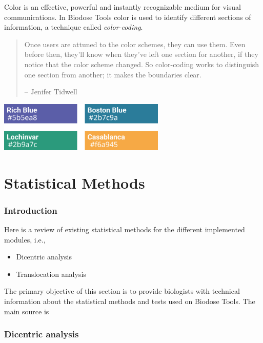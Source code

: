 \documentclass[]{scrartcl}
\providecommand{\tightlist}{%
  \setlength{\itemsep}{0pt}\setlength{\parskip}{0pt}}
\begin{document}
Color is an effective, powerful and instantly recognizable medium for visual communications. In Biodose Tools color is used to identify different sections of information, a technique called \emph{color-coding}.

\begin{quote}
Once users are attuned to the color schemes, they can use them. Even before then, they'll know when they've left one section for another, if they notice that the color scheme changed. So color-coding works to distinguish one section from another; it makes the boundaries clear.

-- Jenifer Tidwell \citep{Tidwel2010}
\end{quote}

\begin{center}\includegraphics[width=300px]{images/user-manual/color-coding} \end{center}

\hypertarget{part-statistical-methods}{%
\part{Statistical Methods}\label{part-statistical-methods}}

\hypertarget{stats-intro}{%
\section{Introduction}\label{stats-intro}}

Here is a review of existing statistical methods for the different implemented modules, i.e.,

\begin{itemize}
\tightlist
\item
  Dicentric analysis
\item
  Translocation analysis
\end{itemize}

The primary objective of this section is to provide biologists with technical information about the statistical methods and tests used on Biodose Tools. The main source is \citep{IAEA2001}

\hypertarget{stats-dicent}{%
\section{Dicentric analysis}\label{stats-dicent}}
\end{document}
